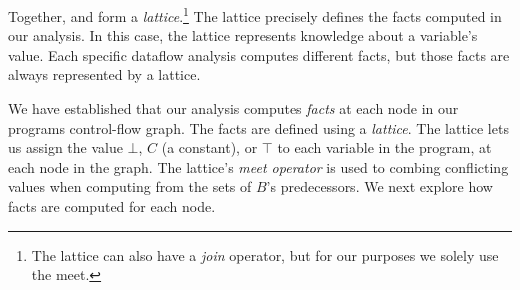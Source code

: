 \documentclass[12pt]{report}
\begin{document}
Together, \setLC and \lub form a \emph{lattice}.\footnote{The lattice
  can also have a \emph{join} operator, but for our purposes we solely
  use the meet.}  The lattice precisely defines the facts computed in
our analysis. In this case, the lattice represents
knowledge about a variable's value. Each specific dataflow analysis
computes different facts, but those facts are always represented by a
lattice.

We have established that our analysis computes \emph{facts} at each
node in our programs control-flow graph. The facts are defined using a
\emph{lattice}. The lattice lets us assign the value $\bot$, $C$ (a
constant), or $\top$ to each variable in the program, at each node in
the graph. The lattice's \emph{meet operator} is used to combing
conflicting values when computing \inBa from the \out sets of $B$'s
predecessors. We next explore how \out facts are computed for each node.




\end{document}
